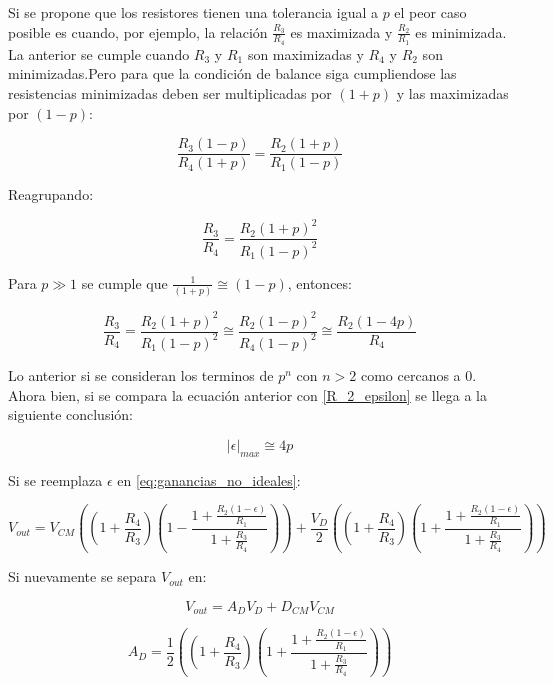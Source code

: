 Si se propone que los resistores tienen una tolerancia igual a $p$ el peor caso posible es cuando, por ejemplo, la relación $\frac{R_3}{R_4}$ es maximizada y $\frac{R_2}{R_1}$ es minimizada. La anterior se cumple cuando $R_3$ y $R_1$ son maximizadas y $R_4$ y $R_2$ son minimizadas.Pero para que la condición de balance siga cumpliendose las resistencias minimizadas deben ser multiplicadas por $(1 + p)$ y las maximizadas por $(1 - p)$:

\begin{equation}
\frac{R_3(1 - p)}{R_4(1 + p)} = \frac{R_2(1 + p)}{R_1(1 - p)}
\end{equation}

Reagrupando:

\begin{equation}
\frac{R_3}{R_4} = \frac{R_2(1 + p)^2}{R_1(1 - p)^2}
\end{equation}

Para $p \gg 1$ se cumple que  $\frac{1}{(1 + p)} \cong (1 - p)$, entonces:

\begin{equation}
\frac{R_3}{R_4} = \frac{R_2(1 + p)^2}{R_1(1 - p)^2} \cong	 \frac{R_2(1 - p)^2}{R_4(1 - p)^2} \cong \frac{R_2(1 - 4p)}{R_4}
\end{equation}

Lo anterior si se consideran los terminos de $p^n$ con $n > 2$ como cercanos a $0$. Ahora bien, si se compara la ecuación anterior con \ref{R_2_epsilon} se llega a la siguiente conclusión:

\begin{equation}
|\epsilon|_{max} \cong 4p
\end{equation}



Si se reemplaza $\epsilon$ en \ref{eq:ganancias_no_ideales}:

\begin{equation}
V_{out} = V_{CM}((1 + \frac{R_4}{R_3})(1 - \frac{1 + \frac{R_2(1 - \epsilon)}{R_1}}{1 + \frac{R_3}{R_4}})) + \frac{V_D}{2}((1 + \frac{R_4}{R_3})(1 + \frac{1 + \frac{R_2(1 - \epsilon)}{R_1}}{1 + \frac{R_3}{R_4}}))
\end{equation}

Si nuevamente se separa $V_{out}$ en:

\begin{equation}
V_{out} = A_DV_D + D_{CM}V_{CM}
\end{equation}

\begin{equation}
A_D = \frac{1}{2}((1 + \frac{R_4}{R_3})(1 + \frac{1 + \frac{R_2(1 - \epsilon)}{R_1}}{1 + \frac{R_3}{R_4}}))
\end{equation}

